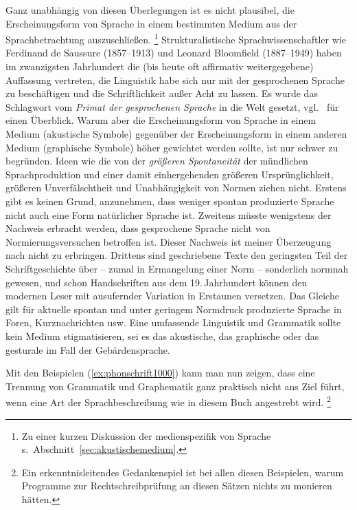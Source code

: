 Ganz unabhängig von diesen Überlegungen ist es nicht plausibel, die Erscheinungsform von Sprache in einem bestimmten Medium aus der Sprachbetrachtung auszuschließen.%
\footnote{Zu einer kurzen Diskussion der medienspezifik von Sprache s.\ Abschnitt~\ref{sec:akustischemedium}.}
Strukturalistische Sprachwissenschaftler wie Ferdinand de Saussure (1857--1913) und Leonard Bloomfield (1887--1949) haben im zwanzigsten Jahrhundert die (bis heute oft affirmativ weitergegebene) Auffassung vertreten, die Linguistik habe sich nur mit der gesprochenen Sprache zu beschäftigen und die Schriftlichkeit außer Acht zu lassen.
Es wurde das Schlagwort vom \textit{Primat der gesprochenen Sprache} in die Welt gesetzt, vgl.\ \cite[Kapitel~0]{Duerscheid2012} für einen Überblick.
Warum aber die Erscheinungsform von Sprache in einem Medium (akustische Symbole) gegenüber der Erscheinungsform in einem anderen Medium (graphische Symbole) höher gewichtet werden sollte, ist nur schwer zu begründen.
Ideen wie die von der \textit{größeren Spontaneität} der mündlichen Sprachproduktion und einer damit einhergehenden größeren Ursprünglichkeit, größeren Unverfälschtheit und Unabhängigkeit von Normen ziehen nicht.
Erstens gibt es keinen Grund, anzunehmen, dass weniger spontan produzierte Sprache nicht auch eine Form natürlicher Sprache ist.
Zweitens müsste wenigstens der Nachweis erbracht werden, dass gesprochene Sprache nicht von Normierungsversuchen betroffen ist.
Dieser Nachweis ist meiner Überzeugung nach nicht zu erbringen.
Drittens sind geschriebene Texte den geringsten Teil der Schriftgeschichte über -- zumal in Ermangelung einer Norm -- sonderlich normnah gewesen, und schon Handschriften aus dem 19.\,Jahrhundert können den modernen Leser mit ausufernder Variation in Erstaunen versetzen.
Das Gleiche gilt für aktuelle spontan und unter geringem Normdruck produzierte Sprache in Foren, Kurznachrichten usw.
Eine umfassende Linguistik und Grammatik sollte kein Medium stigmatisieren, sei es das akustische, das graphische oder \zB das gesturale im Fall der Gebärdensprache.

Mit den Beispielen (\ref{ex:phonschrift1000}) kann man nun zeigen, dass eine Trennung von Grammatik und Graphematik ganz praktisch nicht ans Ziel führt, wenn eine Art der Sprachbeschreibung wie in diesem Buch angestrebt wird.%
\footnote{Ein erkenntnisleitendes Gedankenspiel ist bei allen diesen Beispielen, warum Programme zur Rechtschreibprüfung an diesen Sätzen nichts zu monieren hätten.}

\begin{exe}
  \ex\label{ex:phonschrift1000} 
  \begin{xlist}
  \end{xlist}
\end{exe}

